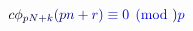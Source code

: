 \documentclass[12pt]{article}
\begin{document}
\makeatletter
\renewcommand*{\@textcolor}[3]{%
  \protect\leavevmode
  \begingroup
    \color#1{#2}#3%
  \endgroup
}
\makeatother
\begin{displaymath}
\mathcolor[RGB]{0,0,15}{c} \mathcolor[RGB]{0,0,30}{\phi} _ { \mathcolor[RGB]{0,0,45}{p} \mathcolor[RGB]{0,0,60}{N} \mathcolor[RGB]{0,0,75}{+} \mathcolor[RGB]{0,0,90}{k} } \mathcolor[RGB]{0,0,105}{(} \mathcolor[RGB]{0,0,120}{p} \mathcolor[RGB]{0,0,135}{n} \mathcolor[RGB]{0,0,150}{+} \mathcolor[RGB]{0,0,165}{r} \mathcolor[RGB]{0,0,180}{)} \mathcolor[RGB]{0,0,195}{\equiv} \mathcolor[RGB]{0,0,210}{0} \mathcolor[RGB]{0,0,225}{\pmod} { \mathcolor[RGB]{0,0,240}{p} }
\end{displaymath}
\end{document}
